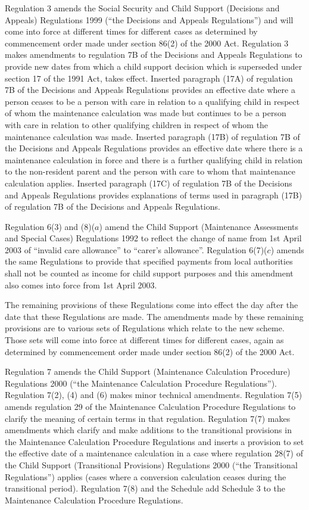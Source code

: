 \documentclass[12pt,a4paper]{article}
\begin{document}
Regulation 3 amends the Social Security and Child Support (Decisions and Appeals) Regulations 1999 (“the Decisions and Appeals Regulations”) and will come into force at different times for different cases as determined by commencement order made under section 86(2) of the 2000 Act. Regulation 3 makes amendments to regulation 7B of the Decisions and Appeals Regulations to provide new dates from which a child support decision which is superseded under section 17 of the 1991 Act, takes effect. Inserted paragraph (17A) of regulation 7B of the Decisions and Appeals Regulations provides an effective date where a person ceases to be a person with care in relation to a qualifying child in respect of whom the maintenance calculation was made but continues to be a person with care in relation to other qualifying children in respect of whom the maintenance calculation was made. Inserted paragraph (17B) of regulation 7B of the Decisions and Appeals Regulations provides an effective date where there is a maintenance calculation in force and there is a further qualifying child in relation to the non-resident parent and the person with care to whom that maintenance calculation applies. Inserted paragraph (17C) of regulation 7B of the Decisions and Appeals Regulations provides explanations of terms used in paragraph (17B) of regulation 7B of the Decisions and Appeals Regulations.

Regulation 6(3) and (8)($a$)  amend the Child Support (Maintenance Assessments and Special Cases) Regulations 1992 to reflect the change of name from 1st April 2003 of “invalid care allowance” to “carer’s allowance”. Regulation 6(7)($c$)  amends the same Regulations to provide that specified payments from local authorities shall not be counted as income for child support purposes and this amendment also comes into force from 1st April 2003.

The remaining provisions of these Regulations come into effect the day after the date that these Regulations are made. The amendments made by these remaining provisions are to various sets of Regulations which relate to the new scheme. Those sets will come into force at different times for different cases, again as determined by commencement order made under section 86(2) of the 2000 Act.

Regulation 7 amends the Child Support (Maintenance Calculation Procedure) Regulations 2000 (“the Maintenance Calculation Procedure Regulations”). Regulation 7(2), (4) and (6) makes minor technical amendments. Regulation 7(5) amends regulation 29 of the Maintenance Calculation Procedure Regulations to clarify the meaning of certain terms in that regulation. Regulation 7(7) makes amendments which clarify and make additions to the transitional provisions in the Maintenance Calculation Procedure Regulations and inserts a provision to set the effective date of a maintenance calculation in a case where regulation 28(7) of the Child Support (Transitional Provisions) Regulations 2000 (“the Transitional Regulations”) applies (cases where a conversion calculation ceases during the transitional period). Regulation 7(8) and the Schedule add Schedule 3 to the Maintenance Calculation Procedure Regulations.
\end{document}
